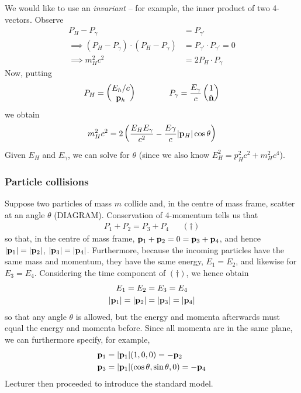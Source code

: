 \documentclass{../../template/note}
\begin{document}
    We would like to use an \emph{invariant} -- for example, the inner product of two 4-vectors. Observe
    \begin{align*}
        P_H - P_{\gamma} &= P_{\gamma'} \\
        \implies (P_H-P_\gamma) \cdot (P_H-P_\gamma) &= P_{\gamma'} \cdot P_{\gamma'} = 0 \\
        \implies m_H^2c^2 &= 2P_H \cdot P_\gamma
    \end{align*}
    Now, putting
    \begin{align*}
        P_H = \begin{pmatrix}
            E_h/c \\
            \V p_h \\
        \end{pmatrix} \qquad \qquad P_\gamma = \frac{E_\gamma}{c} \begin{pmatrix}
            1 \\
            \hvec n \\
        \end{pmatrix}
    \end{align*}
    we obtain
    \begin{align*}
        m_H^2 c^2 = 2\left(\frac{E_HE_\gamma}{c^2} - \frac{E\gamma}{c} |\V p_H| \cos \theta\right)
    \end{align*}
    Given \(E_H\) and \(E_\gamma\), we can solve for \(\theta\) (since we also know \(E_H^2 = p_H^2 c^2 + m_H^2 c^4\)).

    \subsubsection{Particle collisions}

    Suppose two particles of mass \(m\) collide and, in the centre of mass frame, scatter at an angle \(\theta\) (DIAGRAM). Conservation of 4-momentum tells us that
    \begin{align*}
        P_1 + P_2 = P_3 + P_4 && (\dagger)
    \end{align*}
    so that, in the centre of mass frame, \(\V p_1 + \V p_2 = 0 = \V p_3 + \V p_4\), and hence \(|\V p_1| = |\V p_2|\), \(|\V p_3| = |\V p_4|\). Furthermore, because the incoming particles have the same mass and momentum, they have the same energy, \(E_1 = E_2\), and likewise for \(E_3 = E_4\). Considering the time component of \((\dagger)\), we hence obtain
    \begin{align*}
        E_1 = E_2 &= E_3 = E_4 \\
        |\V p_1| = |\V p_2| &= |\V p_3| = |\V p_4|
    \end{align*}
    so that any angle \(\theta\) is allowed, but the energy and momenta afterwards must equal the energy and momenta before. Since all momenta are in the same plane, we can furthermore specify, for example,
    \begin{align*}
        \V p_1 &= |\V p_1|(1, 0, 0) = -\V p_2 \\
        \V p_3 &= |\V p_1|(\cos \theta, \sin \theta, 0) = -\V p_4
    \end{align*}
    Lecturer then proceeded to introduce the standard model.
\end{document}
